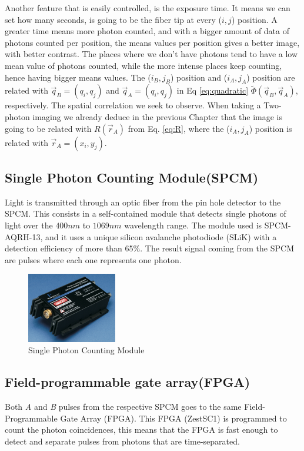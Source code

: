 Another feature that is easily controlled, is the exposure time. It means we can set how many seconds, is going to be the fiber tip at
every ($i,j$) position. A greater time means more photon counted, and with a bigger amount of data of photons
counted per position, the means values per position gives a better image, with better contrast. The places where we don't have photons 
tend to have a low mean value of photons counted, while the more intense places keep counting, hence having bigger means values.
The ($i_B,j_B$) position and ($i_A,j_A$) position are related with $\vec{q}_B=(q_i,q_j)$ and $\vec{q}_A=(q_i,q_j)$ in Eq \ref{eq:quadratic} 
$\tilde{\Phi}(\vec{q}_B,\vec{q}_A)$, respectively. The spatial correlation we seek to observe. When taking a Two-photon imaging we already deduce in the 
previous Chapter that the image is going to be related with $R(\vec{r}_A)$ from Eq. \ref{eq:R}, where the ($i_A,j_A$)
 position is related with $\vec{r}_A=(x_i,y_j)$.






\subsection{Single Photon Counting Module(SPCM)}

Light is transmitted through an optic fiber from the pin hole detector to the SPCM. This 
consists in a self-contained module that detects single photons of light over the $400nm$ to $1069 nm$
wavelength range. The module used  is SPCM-AQRH-13, and it uses a unique silicon avalanche photodiode (SLiK) with a detection efficiency of more than 65\%\cite{spcm}.
The result signal coming from the SPCM are pulses where each one represents one photon.
\begin{figure}[h]
\centering
\includegraphics[width=0.35\textwidth]{Figures/spcm.png}
\caption{Single Photon Counting Module} 
\label{fig:spcm}
\end{figure}


\subsection{Field-programmable gate array(FPGA)}
Both \textit{A} and \textit{B} pulses from the respective SPCM goes to the same Field-Programmable Gate Array (FPGA). This
FPGA (ZestSC1) is programmed
to count the photon coincidences, this means that the FPGA is fast enough to detect and separate pulses from photons 
that are time-separated. 




